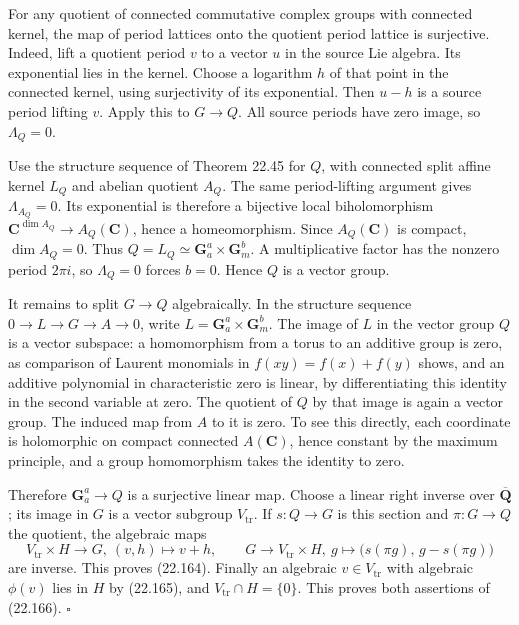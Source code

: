 \documentclass[
  11pt,
  a4paper,
]{article}
\begin{document}
For any quotient of connected commutative complex groups with connected
kernel, the map of period lattices onto the quotient period lattice is
surjective. Indeed, lift a quotient period \(v\) to a vector \(u\) in
the source Lie algebra. Its exponential lies in the kernel. Choose a
logarithm \(h\) of that point in the connected kernel, using
surjectivity of its exponential. Then \(u-h\) is a source period lifting
\(v\). Apply this to \(G\to Q\). All source periods have zero image, so
\(\Lambda_Q=0\).

Use the structure sequence of Theorem 22.45 for \(Q\), with connected
split affine kernel \(L_Q\) and abelian quotient \(A_Q\). The same
period-lifting argument gives \(\Lambda_{A_Q}=0\). Its exponential is
therefore a bijective local biholomorphism
\(\mathbf C^{\dim A_Q}\to A_Q(\mathbf C)\), hence a homeomorphism. Since
\(A_Q(\mathbf C)\) is compact, \(\dim A_Q=0\). Thus
\(Q=L_Q\simeq\mathbf G_a^a\times\mathbf G_m^b\). A multiplicative factor
has the nonzero period \(2\pi i\), so \(\Lambda_Q=0\) forces \(b=0\).
Hence \(Q\) is a vector group.

It remains to split \(G\to Q\) algebraically. In the structure sequence
\(0\to L\to G\to A\to0\), write \(L=\mathbf G_a^a\times\mathbf G_m^b\).
The image of \(L\) in the vector group \(Q\) is a vector subspace: a
homomorphism from a torus to an additive group is zero, as comparison of
Laurent monomials in \(f(xy)=f(x)+f(y)\) shows, and an additive
polynomial in characteristic zero is linear, by differentiating this
identity in the second variable at zero. The quotient of \(Q\) by that
image is again a vector group. The induced map from \(A\) to it is zero.
To see this directly, each coordinate is holomorphic on compact
connected \(A(\mathbf C)\), hence constant by the maximum principle, and
a group homomorphism takes the identity to zero.

Therefore \(\mathbf G_a^a\to Q\) is a surjective linear map. Choose a
linear right inverse over \(\overline{\mathbf Q}\); its image in \(G\)
is a vector subgroup \(V_{\mathrm{tr}}\). If \(s:Q\to G\) is this
section and \(\pi:G\to Q\) the quotient, the algebraic maps \[
 V_{\mathrm{tr}}\times H\longrightarrow G,\ (v,h)\longmapsto v+h,
 \qquad
 G\longrightarrow V_{\mathrm{tr}}\times H,\ 
 g\longmapsto\bigl(s(\pi g),\,g-s(\pi g)\bigr)
 \tag{22.167}
\] are inverse. This proves (22.164). Finally an algebraic
\(v\in V_{\mathrm{tr}}\) with algebraic \(\phi(v)\) lies in \(H\) by
(22.165), and \(V_{\mathrm{tr}}\cap H=\{0\}\). This proves both
assertions of (22.166). \(\square\)
\end{document}
